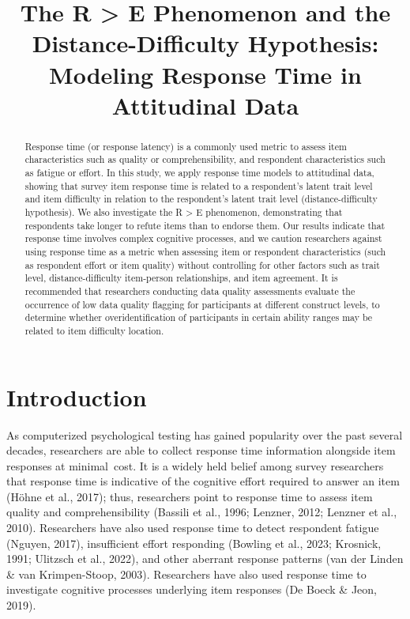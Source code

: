 \documentclass[
]{agujournal2019}
\begin{document}
\title{The R \textgreater{} E Phenomenon and the Distance-Difficulty
Hypothesis: Modeling Response Time in Attitudinal Data}




\begin{abstract}
Response time (or response latency) is a commonly used metric to assess
item characteristics such as quality or comprehensibility, and
respondent characteristics such as fatigue or effort. In this study, we
apply response time models to attitudinal data, showing that survey item
response time is related to a respondent's latent trait level and item
difficulty in relation to the respondent's latent trait level
(distance-difficulty hypothesis). We also investigate the R
\textgreater{} E phenomenon, demonstrating that respondents take longer
to refute items than to endorse them. Our results indicate that response
time involves complex cognitive processes, and we caution researchers
against using response time as a metric when assessing item or
respondent characteristics (such as respondent effort or item quality)
without controlling for other factors such as trait level,
distance-difficulty item-person relationships, and item agreement. It is
recommended that researchers conducting data quality assessments
evaluate the occurrence of low data quality flagging for participants at
different construct levels, to determine whether overidentification of
participants in certain ability ranges may be related to item difficulty
location.
\end{abstract}





\section{Introduction}\label{introduction}

As computerized psychological testing has gained popularity over the
past several decades, researchers are able to collect response time
information alongside item responses at minimal~cost. It is a widely
held belief among survey researchers that response time is indicative of
the cognitive effort required to answer an item (Höhne et al., 2017);
thus, researchers point to response time to assess item quality and
comprehensibility (Bassili et al., 1996; Lenzner, 2012; Lenzner et al.,
2010). Researchers have also used response time to detect respondent
fatigue (Nguyen, 2017), insufficient effort responding (Bowling et al.,
2023; Krosnick, 1991; Ulitzsch et al., 2022), and other aberrant
response patterns (van der Linden \& van Krimpen-Stoop, 2003).
Researchers have also used response time to investigate cognitive
processes underlying item responses (De Boeck \& Jeon, 2019).
\end{document}
